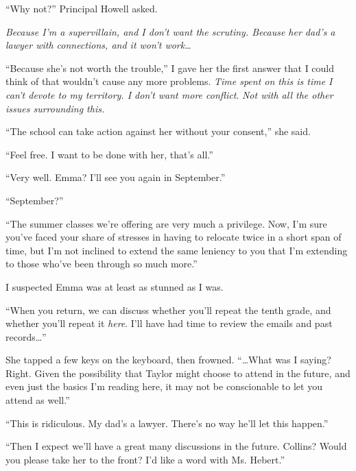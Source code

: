 ``Why not?''  Principal Howell asked.



\emph{Because I'm a supervillain, and I don't want the scrutiny.  Because her dad's a lawyer with connections, and it won't work\ldots}



``Because she's not worth the trouble,'' I gave her the first answer that I could think of that wouldn't cause any more problems.  \emph{Time spent on this is time I can't devote to my territory.  I don't want more conflict}.  \emph{Not with all the other issues surrounding this.}



``The school can take action against her without your consent,'' she said.



``Feel free.  I want to be done with her, that's all.''



``Very well.  Emma?  I'll see you again in September.''



``September?''



``The summer classes we're offering are very much a privilege.  Now, I'm sure you've faced your share of stresses in having to relocate twice in a short span of time, but I'm not inclined to extend the same leniency to you that I'm extending to those who've been through so much more.''



I suspected Emma was at least as stunned as I was.



``When you return, we can discuss whether you'll repeat the tenth grade, and whether you'll repeat it \emph{here}.  I'll have had time to review the emails and past records\ldots''



She tapped a few keys on the keyboard, then frowned.  ``\ldots{}What was I saying?  Right.  Given the possibility that Taylor might choose to attend in the future, and even just the basics I'm reading here, it may not be conscionable to let you attend as well.''



``This is ridiculous.  My dad's a lawyer.  There's no way he'll let this happen.''



``Then I expect we'll have a great many discussions in the future.  Collins?  Would you please take her to the front?  I'd like a word with Ms. Hebert.''



